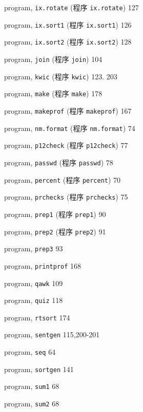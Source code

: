 \begin{multicols}{3}
\hangindent=3pc  program, \verb'ix.rotate' (程序 \verb'ix.rotate')
127

\hangindent=3pc  program, \verb'ix.sort1' (程序 \verb'ix.sort1') 126

\hangindent=3pc  program, \verb'ix.sort2' (程序 \verb'ix.sort2') 128

\hangindent=3pc  program, \verb'join' (程序 \verb'join') 104

\hangindent=3pc  program, \verb'kwic' (程序 \verb'kwic') 123. 203

\hangindent=3pc  program, \verb'make' (程序 \verb'make') 178

\hangindent=3pc  program, \verb'makeprof' (程序 \verb'makeprof') 167

\hangindent=3pc  program, \verb'nm.format' (程序 \verb'nm.format')
74

\hangindent=3pc  program, \verb'p12check' (程序 \verb'p12check') 77

\hangindent=3pc  program, \verb'passwd' (程序 \verb'passwd') 78

\hangindent=3pc  program, \verb'percent' (程序 \verb'percent') 70

\hangindent=3pc  program, \verb'prchecks' (程序 \verb'prchecks') 75

\hangindent=3pc  program, \verb'prep1' (程序 \verb'prep1') 90

\hangindent=3pc  program, \verb'prep2' (程序 \verb'prep2') 91

\hangindent=3pc  program, \verb'prep3' 93

\hangindent=3pc  program, \verb'printprof' 168

\hangindent=3pc  program, \verb'qawk' 109

\hangindent=3pc  program, \verb'quiz' 118

\hangindent=3pc  program, \verb'rtsort' 174

\hangindent=3pc  program, \verb'sentgen' 115,200-201

\hangindent=3pc  program, \verb'seq' 64

\hangindent=3pc  program, \verb'sortgen' 141

\hangindent=3pc  program, \verb'sum1' 68

\hangindent=3pc  program, \verb'sum2' 68


\end{multicols}
